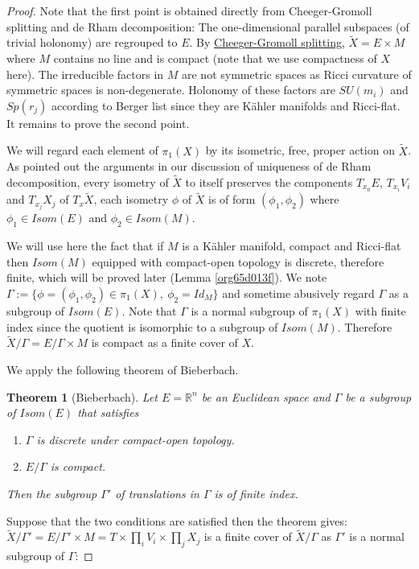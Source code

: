 \documentclass[11pt]{article}
\newtheorem{theorem}{Theorem}
\begin{document}
\begin{proof}
Note that the first point is obtained directly from Cheeger-Gromoll splitting and de Rham
decomposition: The one-dimensional parallel subspaces (of trivial holonomy) are regrouped to \(E\). By
\href{Cheeger-Gromoll-splitting.org}{Cheeger-Gromoll splitting}, \(\tilde X = E\times M\) where \(M\) contains no line and is compact (note
that we use compactness of \(X\) here). The irreducible factors in \(M\) are not symmetric spaces as
Ricci curvature of symmetric spaces is non-degenerate. Holonomy of these factors are \(SU(m_i)\) and
\(Sp(r_j)\) according to Berger list since they are Kähler manifolds and Ricci-flat. It remains to
prove the second point.

We will regard each element of \(\pi_1(X)\) by its isometric, free, proper action on \(\tilde X\). As
pointed out the arguments in our discussion of uniqueness of de Rham decomposition, every isometry
of \(\tilde X\) to itself preserves the components \(T_{x_0}E\), \(T_{x_i}V_i\) and \(T_{x_j}X_j\)
of \(T_x \tilde X\), each isometry \(\phi\) of \(\tilde X\) is of form \((\phi_1,\phi_2)\) where \(\phi_1\in
Isom(E)\) and \(\phi_2\in Isom(M)\).

We will use here the fact that if \(M\) is a Kähler manifold, compact and Ricci-flat then \(Isom(M)\)
equipped with compact-open topology is discrete, therefore finite, which will be proved later (Lemma
\ref{org65d013f}). We note \(\Gamma := \{\phi = (\phi_1,\phi_2)\in \pi_1(X),\ \phi_2 = Id_M\}\) and
sometime abusively regard \(\Gamma\) as a subgroup of \(Isom(E)\). Note that \(\Gamma\) is a normal
subgroup of \(\pi_1(X)\) with finite index since the quotient is isomorphic to a subgroup of
\(Isom(M)\). Therefore \(\tilde X/\Gamma = E/\Gamma\times M\) is compact as a finite cover of \(X\).

We apply the following theorem of Bieberbach.
\begin{theorem}[Bieberbach]
Let \(E = \mathbb{R}^n\) be an Euclidean space and \(\Gamma\) be a subgroup of \(Isom(E)\) that satisfies
\begin{enumerate}
\item \(\Gamma\) is discrete under compact-open topology.
\item \(E/\Gamma\) is compact.
\end{enumerate}
Then the subgroup \(\Gamma'\) of translations in \(\Gamma\) is of finite index.
\end{theorem}

Suppose that the two conditions are satisfied then the theorem gives: \(\tilde X/\Gamma' =
E/\Gamma'\times M = T\times \prod_i V_i\times \prod_j X_j\) is a finite cover of
\(\tilde X/\Gamma\) as \(\Gamma'\) is a normal subgroup of \(\Gamma\):


\end{proof}
\end{document}
